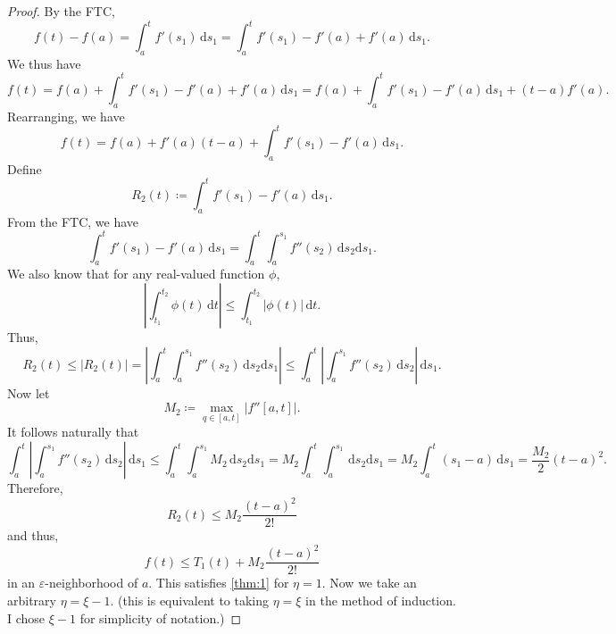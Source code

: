 \begin{proof}
	By the FTC,
	\[
		f(t)-f(a)=\int_{a}^{t} f'(s_1) \,\mathrm{d} s_1 = \int_{a}^{t} f'(s_1)-f'(a)+f'(a) \,\mathrm{d} s_1
	.\]
	We thus have
	\[
		f(t)=f(a)+\int_{a}^{t} f'(s_1)-f'(a)+f'(a) \,\mathrm{d} s_1=f(a)+\int_{a}^{t} f'(s_1)-f'(a) \,\mathrm{d} s_1+(t-a)f'(a)
	.\]
	Rearranging, we have
	\[
		f(t)=f(a)+f'(a)(t-a)+\int_{a}^{t} f'(s_1)-f'(a) \,\mathrm{d} s_1
	.\]
	Define
	\[		R_{2}(t)\coloneqq \int_{a}^{t} f'(s_1)-f'(a) \,\mathrm{d}s_1 
	.\]
	From the FTC, we have
	\[
		\int_{a}^{t} f'(s_1)-f'(a) \,\mathrm{d} s_1=\int_{a}^{t}\int_{a}^{s_1} f''(s_2) \,\mathrm{d} s_2 \mathrm{d} s_1
	.\]
	We also know that for any real-valued function $\phi $,
	\[
		\left| \int_{t_1}^{t_2} \phi (t) \,\mathrm{d} t \right| \leq \int_{t_1}^{t_2} \left| \phi (t) \right|  \,\mathrm{d} t
	.\]
	Thus,
	\[
		R_2(t)\leq \left| R_{2}(t) \right| =\left| \int_{a}^{t}\int_{a}^{s_1} f''(s_2) \,\mathrm{d} s_2 \mathrm{d} s_1 \right| \leq \int_{a}^{t} \left| \int_{a}^{s_1} f''(s_2) \,\mathrm{d} s_2 \right|  \,\mathrm{d} s_1
	.\]
	Now let
	\[
		M_2 \coloneqq \max_{q\in[a,t]}\left|f''[a,t]\right|
	.\]
	It follows naturally that
	\[
		\int_{a}^{t} \left| \int_{a}^{s_1} f''(s_2) \,\mathrm{d} s_2 \right|  \,\mathrm{d} s_1 \leq \int_{a}^{t}\int_{a}^{s_1} M_2 \,\mathrm{d} s_2 \mathrm{d} s_1=M_2\int_{a}^{t}\int_{a}^{s_1}  \,\mathrm{d} s_2 \mathrm{d} s_1 = M_2\int_{a}^{t} (s_1-a) \,\mathrm{d} s_1=\frac{M_2}{2} (t-a)^2
	.\]
	Therefore,
	\[
		R_2(t)\leq M_2 \frac{(t-a)^2}{2!}
	\]
	and thus,
	\[
		f(t)\leq T_1(t)+ M_2 \frac{(t-a)^2}{2!}
	\]
	in an $\varepsilon$-neighborhood of $a$. This satisfies \ref{thm:1} for $\eta =1$. Now we take an arbitrary $\eta =\xi-1 $. (this is equivalent to taking $\eta =\xi $ in the method of induction. I chose $\xi -1$ for simplicity of notation.)
	

\end{proof}

